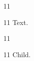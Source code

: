 \documentclass[paper=A4]{ropas-poster}
\begin{document}
\begin{postergrid}{1}{1}
\begin{posterblock}{1}{1}
Text.\begin{postergrid}{1}{1}
\begin{posterblock}{1}{1}
Child.
\end{posterblock}
\end{postergrid}
\end{posterblock}
\end{postergrid}
\end{document}
